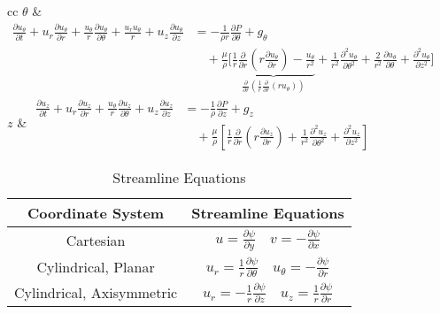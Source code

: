 \begin{table}[h]
\begin{tabular}{cc}
        $\theta$ & \(\displaystyle \begin{aligned} \frac{\partial u_{\theta}}{\partial t} + u_r \frac{\partial u_{\theta}}{\partial r} + \frac{u_{\theta}}{r} \frac{\partial u_{\theta}}{\partial \theta} + \frac{u_r u_{\theta}}{r} + u_z \frac{\partial u_{\theta}}{\partial z} &= -\frac{1}{\rho r} \frac{\partial P}{\partial \theta} + g_{\theta} \\ &\quad + \frac{\mu}{\rho} \biggr[\underbrace{\frac{1}{r} \frac{\partial}{\partial r}\left(r \frac{\partial u_{\theta}}{\partial r}\right) - \frac{u_{\theta}}{r^2}}_{\displaystyle \frac{\partial}{\partial r}\left(\frac{1}{r}\frac{\partial}{\partial r}(r u_{\theta})\right)} + \frac{1}{r^2} \frac{\partial^2 u_{\theta}}{\partial \theta^2} + \frac{2}{r^2} \frac{\partial u_{\theta}}{\partial \theta} + \frac{\partial^2 u_{\theta}}{\partial z^2}\biggr] \end{aligned}\) \\[9ex]
        $z$ & \(\displaystyle \begin{aligned} \frac{\partial u_z}{\partial t} + u_r \frac{\partial u_z}{\partial r} + \frac{u_{\theta}}{r} \frac{\partial u_z}{\partial \theta} + u_z \frac{\partial u_z}{\partial z} &= -\frac{1}{\rho} \frac{\partial P}{\partial z} + g_z \\ &\quad + \frac{\mu}{\rho} \left[\frac{1}{r} \frac{\partial}{\partial r}\left(r \frac{\partial u_z}{\partial r}\right) + \frac{1}{r^2} \frac{\partial^2 u_z}{\partial \theta^2} + \frac{\partial^2 u_z}{\partial z^2}\right] \end{aligned}\) \\[7ex]
        \bottomrule
    \end{tabular}
\end{table}

\begin{table}[H]
    \centering
    \caption{Streamline Equations}
    \begin{tabular}{cc}
        \toprule
        Coordinate System & Streamline Equations \\
        \midrule
        Cartesian & \(\displaystyle u = \frac{\partial \psi}{\partial y} \quad v = -\frac{\partial \psi}{\partial x}\) \\
        Cylindrical, Planar & \(\displaystyle u_r = \frac{1}{r} \frac{\partial \psi}{\partial \theta} \quad u_{\theta} = -\frac{\partial \psi}{\partial r}\) \\
        Cylindrical, Axisymmetric & \(\displaystyle u_r = - \frac{1}{r} \frac{\partial \psi}{\partial z} \quad u_z = \frac{1}{r} \frac{\partial \psi}{\partial r}\) \\
        \bottomrule
    \end{tabular}
\end{table}

